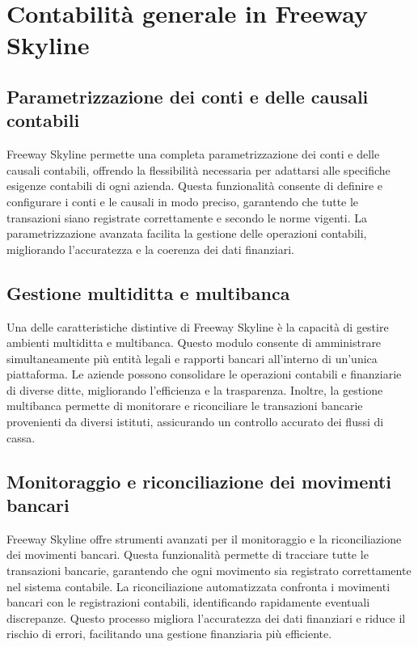 \documentclass{article}
\begin{document}
\section{Contabilità generale in Freeway Skyline}

\subsection{Parametrizzazione dei conti e delle causali contabili}

Freeway Skyline permette una completa parametrizzazione dei conti e delle causali contabili, offrendo la flessibilità necessaria per adattarsi alle specifiche esigenze contabili di ogni azienda. Questa funzionalità consente di definire e configurare i conti e le causali in modo preciso, garantendo che tutte le transazioni siano registrate correttamente e secondo le norme vigenti. La parametrizzazione avanzata facilita la gestione delle operazioni contabili, migliorando l'accuratezza e la coerenza dei dati finanziari.

\subsection{Gestione multiditta e multibanca}

Una delle caratteristiche distintive di Freeway Skyline è la capacità di gestire ambienti multiditta e multibanca. Questo modulo consente di amministrare simultaneamente più entità legali e rapporti bancari all'interno di un'unica piattaforma. Le aziende possono consolidare le operazioni contabili e finanziarie di diverse ditte, migliorando l'efficienza e la trasparenza. Inoltre, la gestione multibanca permette di monitorare e riconciliare le transazioni bancarie provenienti da diversi istituti, assicurando un controllo accurato dei flussi di cassa.

\subsection{Monitoraggio e riconciliazione dei movimenti bancari}

Freeway Skyline offre strumenti avanzati per il monitoraggio e la riconciliazione dei movimenti bancari. Questa funzionalità permette di tracciare tutte le transazioni bancarie, garantendo che ogni movimento sia registrato correttamente nel sistema contabile. La riconciliazione automatizzata confronta i movimenti bancari con le registrazioni contabili, identificando rapidamente eventuali discrepanze. Questo processo migliora l'accuratezza dei dati finanziari e riduce il rischio di errori, facilitando una gestione finanziaria più efficiente.
\end{document}
